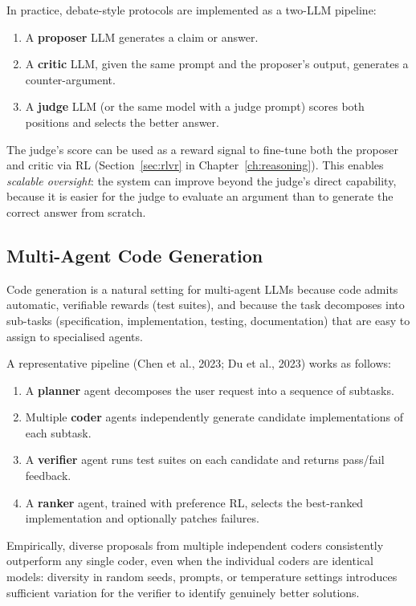 In practice, debate-style protocols are implemented as a two-LLM
pipeline:
\begin{enumerate}[leftmargin=*]
  \item A \textbf{proposer} LLM generates a claim or answer.
  \item A \textbf{critic} LLM, given the same prompt and the
    proposer's output, generates a counter-argument.
  \item A \textbf{judge} LLM (or the same model with a judge prompt)
    scores both positions and selects the better answer.
\end{enumerate}
The judge's score can be used as a reward signal to fine-tune both
the proposer and critic via RL (Section~\ref{sec:rlvr} in
Chapter~\ref{ch:reasoning}). This enables \emph{scalable oversight}:
the system can improve beyond the judge's direct capability,
because it is easier for the judge to evaluate an argument than
to generate the correct answer from scratch.

\subsection{Multi-Agent Code Generation}

Code generation is a natural setting for multi-agent LLMs because
code admits automatic, verifiable rewards (test suites), and because
the task decomposes into sub-tasks (specification, implementation,
testing, documentation) that are easy to assign to specialised agents.

A representative pipeline (Chen et al., 2023; Du et al., 2023) works
as follows:
\begin{enumerate}[leftmargin=*]
  \item A \textbf{planner} agent decomposes the user request into a
    sequence of subtasks.
  \item Multiple \textbf{coder} agents independently generate
    candidate implementations of each subtask.
  \item A \textbf{verifier} agent runs test suites on each candidate
    and returns pass/fail feedback.
  \item A \textbf{ranker} agent, trained with preference RL, selects
    the best-ranked implementation and optionally patches failures.
\end{enumerate}
Empirically, diverse proposals from multiple independent coders
consistently outperform any single coder, even when the individual
coders are identical models: diversity in random seeds, prompts, or
temperature settings introduces sufficient variation for the verifier
to identify genuinely better solutions.

